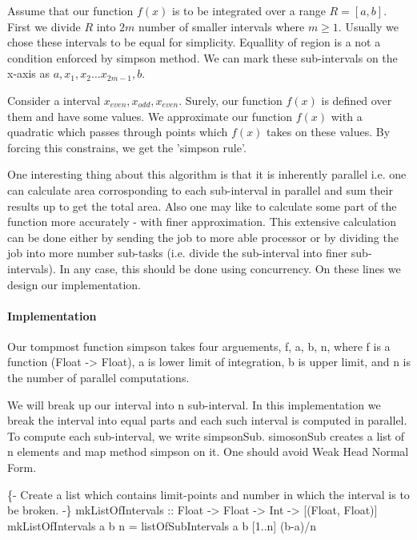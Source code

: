 \documentclass{article}%
\begin{document}
Assume that our function $f(x)$ is to be integrated over a range $R = [a,
b]$. First we divide $R$ into $2m$ number of smaller intervals where $m
\geq 1$. Usually we chose these intervals to be equal for simplicity.
Equallity of region is a not a condition enforced by simpson method.
We can mark these sub-intervals on the x-axis as $a, x_1, x_2 \ldots
x_{2m-1} , b$.

Consider a interval $x_{even}, x_{odd}, x_{even}$. Surely, our
function $f(x)$ is defined over them and have some values. We
approximate our function $f(x)$ with a quadratic which  passes
through points which $f(x)$ takes on these values. By forcing this
constrains, we get the 'simpson rule'.

One interesting thing about this algorithm is that it is inherently
parallel i.e. one can calculate area corrosponding to each
sub-interval in parallel and sum their results up to get the total
area. Also one may like to calculate some part of the function more
accurately - with finer approximation. This extensive calculation can
be done either by sending the job to more able processor or by
dividing the job into more number sub-tasks (i.e.  divide the
sub-interval into finer sub-intervals). In any case, this should be
done using concurrency. On these lines we design our implementation.

\paragraph{Implementation}

Our tompmost function {\Tt{}simpson\nwendquote} takes four arguements, f, a,
b, n, where f is a function (Float -> Float), a is lower limit of
integration, b is upper limit, and n is the number of parallel
computations.

We will break up our interval into n sub-interval. In this
implementation we break the interval into equal parts and each such
interval is computed in parallel. To compute each sub-interval, we
write {\Tt{}simpsonSub\nwendquote}. {\Tt{}simosonSub\nwendquote} creates a list of n elements and
map method {\Tt{}simpson\nwendquote} on it. One should avoid Weak Head Normal Form.


\nwenddocs{}\endmoddef\nwstartdeflinemarkup\nwenddeflinemarkup
\{- 
    Create a list which contains limit-points and number in which the
    interval is to be broken.
-\}
mkListOfIntervals :: Float -> Float -> Int -> [(Float, Float)]
mkListOfIntervals a b n = listOfSubIntervals a b [1..n] (b-a)/n
\end{document}
